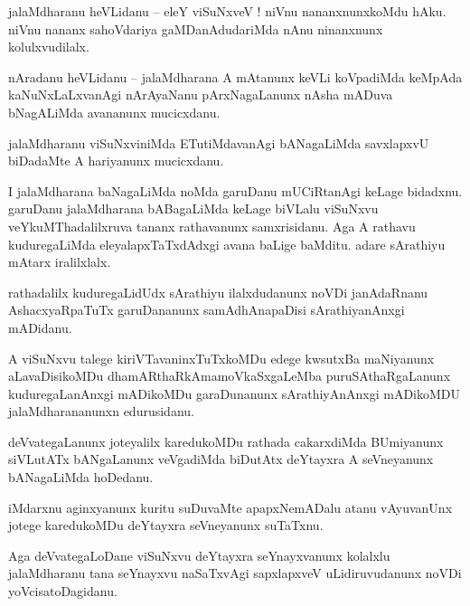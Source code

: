 \documentclass{article}
\begin{document}
\begin{mn}%
jalaMdharanu heVLidanu -- eleY viSuNxveV ! niVnu nananxnunxkoMdu hAku. niVnu nananx 
sahoVdariya gaMDanAdudariMda nAnu ninanxnunx kolulxvudilalx.
\end{mn}

\begin{mn}%
nAradanu heVLidanu -- jalaMdharana A mAtanunx keVLi koVpadiMda keMpAda kaNuNxLaLxvanAgi 
nArAyaNanu pArxNagaLanunx nAsha mADuva bNagALiMda avananunx mucicxdanu.
\end{mn}

\begin{mn}%
jalaMdharanu viSuNxviniMda ETutiMdavanAgi bANagaLiMda savxlapxvU biDadaMte A hariyanunx 
mucicxdanu.
\end{mn}

\begin{mn}%
I jalaMdharana baNagaLiMda noMda garuDanu mUCiRtanAgi keLage bidadxnu. garuDanu jalaMdharana 
bABagaLiMda keLage biVLalu viSuNxvu veYkuMThadalilxruva tananx rathavanunx samxrisidanu. Aga 
A rathavu kuduregaLiMda eleyalapxTaTxdAdxgi avana baLige baMditu. adare sArathiyu mAtarx 
iralilxlalx.
\end{mn}

\begin{mn}%
rathadalilx kuduregaLidUdx sArathiyu ilalxdudanunx noVDi janAdaRnanu AshacxyaRpaTuTx 
garuDananunx samAdhAnapaDisi sArathiyanAnxgi mADidanu.
\end{mn}

\begin{mn}%
A viSuNxvu talege kiriVTavaninxTuTxkoMDu edege kwsutxBa maNiyanunx aLavaDisikoMDu 
dhamARthaRkAmamoVkaSxgaLeMba puruSAthaRgaLanunx kuduregaLanAnxgi mADikoMDu garaDunanunx 
sArathiyAnAnxgi mADikoMDU jalaMdharananunxn edurusidanu.
\end{mn}

\begin{mn}%
deVvategaLanunx joteyalilx karedukoMDu rathada cakarxdiMda BUmiyanunx siVLutATx bANgaLanunx 
veVgadiMda biDutAtx deYtayxra A seVneyanunx bANagaLiMda hoDedanu.
\end{mn}

\begin{mn}%
iMdarxnu aginxyanunx kuritu suDuvaMte apapxNemADalu atanu vAyuvanUnx jotege karedukoMDu 
deYtayxra seVneyanunx suTaTxnu.
\end{mn}

\begin{mn}%
Aga deVvategaLoDane viSuNxvu deYtayxra seYnayxvanunx kolalxlu jalaMdharanu tana seYnayxvu 
naSaTxvAgi sapxlapxveV uLidiruvudanunx noVDi yoVcisatoDagidanu.
\end{mn}
\end{document}
